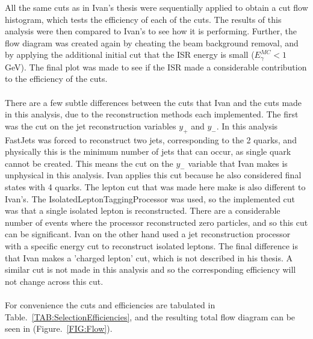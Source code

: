 All the same cuts as in Ivan’s thesis \cite{IvanMarchesini} were sequentially applied to obtain a cut flow histogram, which tests the efficiency of each of the cuts. The results of this analysis were then compared to Ivan's to see how it is performing. Further, the flow diagram was created again by cheating the beam background removal, and by applying the additional initial cut that the ISR energy is small (${E}_{\gamma}^{MC} < 1$ GeV). The final plot was made to see if the ISR made a considerable contribution to the efficiency of the cuts.
\\\\
There are a few subtle differences between the cuts that Ivan and the cuts made in this analysis, due to the reconstruction methods each implemented. The first was the cut on the jet reconstruction variables ${y}_{+}$ and ${y}_{-}$. In this analysis FastJets was forced to reconstruct two jets, corresponding to the 2 quarks, and physically this is the minimum number of jets that can occur, as single quark cannot be created. This means the cut on the ${y}_{-}$ variable that Ivan makes is unphysical in this analysis. Ivan applies this cut because he also considered final states with 4 quarks. The lepton cut that was made here make is also different to Ivan’s. The IsolatedLeptonTaggingProcessor was used, so the implemented cut was that a single isolated lepton is reconstructed. There are a considerable number of events where the processor reconstructed zero particles, and so this cut can be significant. Ivan on the other hand used a jet reconstruction processor with a specific energy cut to reconstruct isolated leptons. The final difference is that Ivan makes a 'charged lepton' cut, which is not described in his thesis. A similar cut is not made in this analysis and so the corresponding efficiency will not change across this cut.
\\\\
For convenience the cuts and efficiencies are tabulated in Table.~\ref{TAB:SelectionEfficiencies}, and the resulting total flow diagram can be seen in (Figure.~\ref{FIG:Flow}).
\\\\
